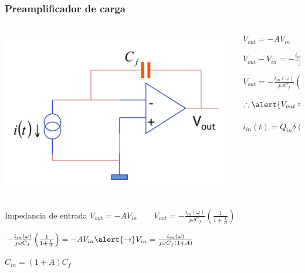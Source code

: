 \documentclass{beamer}
\begin{document}
\begin{frame}
\frametitle{Preamplificador de carga}
\begin{columns}
\begin{column}{0.5\textwidth}
\includegraphics[width=\textwidth]{d2/charge_preamplifier_zin}
\end{column}
\begin{column}{0.5\textwidth}
\begin{center}
$V_{out} = -AV_{in}$

\vspace{2mm}
$V_{out} - V_{in} = -\frac{i_{in}(\omega)}{j \omega C_f}$

\vspace{2mm}
$V_{out} = -\frac{i_{in}(\omega)}{j \omega C_f}\left(\frac{1}{1+\frac{1}{A}}\right)$

\vspace{2mm}
$\therefore \alert{V_{out} \approx -\frac{i_{in}(\omega)}{j \omega C_f}}$

\vspace{1.5mm}
$i_{in}(t) = Q_{in}\delta (t) \qquad V_{out}(t) = -\frac{Q(t)}{C_f}$
\end{center}
\end{column}
\end{columns}
\begin{block}{Impedancia de entrada}
$V_{out} = -AV_{in} \qquad V_{out} = -\frac{i_{in}(\omega)}{j \omega
C_f}\left(\frac{1}{1+\frac{1}{A}}\right)$

\vspace{1.5mm}
$-\frac{i_{in}(\omega)}{j \omega C_f}\left(\frac{1}{1+\frac{1}{A}}\right) =
-AV_{in} \alert{\rightarrow} V_{in} = \frac{i_{in}(\omega)}{j \omega C_f (1 + A)}$

\vspace{1.5mm}
\alert{$C_{in} = (1 + A) C_f$}
\end{block}
\end{frame}
\end{document}
